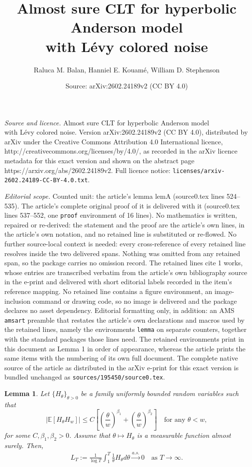 \documentclass[10pt,a4paper]{amsart}
\title{Almost sure CLT for hyperbolic Anderson model \\ with L\'evy colored noise}
\author{Raluca M. Balan, Hanniel E. Kouam\'e, William D. Stephenson}
\date{Source: arXiv:2602.24189v2 (CC BY 4.0)}
\newtheorem{lemma}{Lemma}
\def\bE{\mathbb{E}}
\begin{document}
\maketitle

\noindent\emph{Source and licence.} Almost sure CLT for hyperbolic Anderson model \\ with L\'evy colored noise. Version arXiv:2602.24189v2 (CC BY 4.0), distributed by arXiv under the Creative Commons Attribution 4.0 International licence, http://creativecommons.org/licenses/by/4.0/, as recorded in the arXiv licence metadata for this exact version and shown on the abstract page https://arxiv.org/abs/2602.24189v2. Full licence notice: \texttt{licenses/arxiv-2602.24189-CC-BY-4.0.txt}.\par\smallskip

\noindent\textit{Editorial scope.} Counted unit: the article's lemma lemA (source0.tex lines 524--535). The article's complete original proof of it is delivered with it (source0.tex lines 537--552, one \texttt{proof} environment of 16 lines). No mathematics is written, repaired or re-derived: the statement and the proof are the article's own lines, in the article's own notation, and no retained line is substituted or re-flowed.  No further source-local context is needed: every cross-reference of every retained line resolves inside the two delivered spans.  Nothing was omitted from any retained span, so the package carries no omission record.  The retained lines cite 1 works, whose entries are transcribed verbatim from the article's own bibliography source in the e-print and delivered with short editorial labels recorded in the item's reference mapping.  No retained line contains a figure environment, an image-inclusion command or drawing code, so no image is delivered and the package declares no asset dependency.  Editorial formatting only, in addition: an AMS \texttt{amsart} preamble that restates the article's own declarations and macros used by the retained lines, namely the environments \texttt{lemma} on separate counters, together with the standard packages those lines need.  The retained environments print in this document as Lemma 1 in order of appearance, whereas the article prints the same items with the numbering of its own full document.  The complete native source of the article as distributed in the arXiv e-print for this exact version is bundled unchanged as \texttt{sources/195450/source0.tex}.
\begin{lemma}
\label{lemA}
Let $\{ H_\theta\}_{\theta > 0}$ be a family uniformly bounded random variables such that 
\[
\big| \bE[ H_{\theta} H_{w} ] \big| \leq C \left[ \left( \frac{\theta}{w} \right)^{\beta_1}+ \left( \frac{\theta}{w} \right)^{\beta_2}\right] \quad \mbox{for any $\theta<w$}, 
\]
for some $C,\beta_1,\beta_2>0$. Assume that $\theta\mapsto H_\theta$ is a measurable
function almost surely. Then,
\begin{align*} 
L_T:=\frac{1}{\log T} \int_1^T \frac{1}{\theta} H_\theta d\theta \stackrel{a.s.}{\longrightarrow} 0 \quad \mbox{as $T \to \infty$}.
\end{align*}
\end{lemma}
\end{document}
